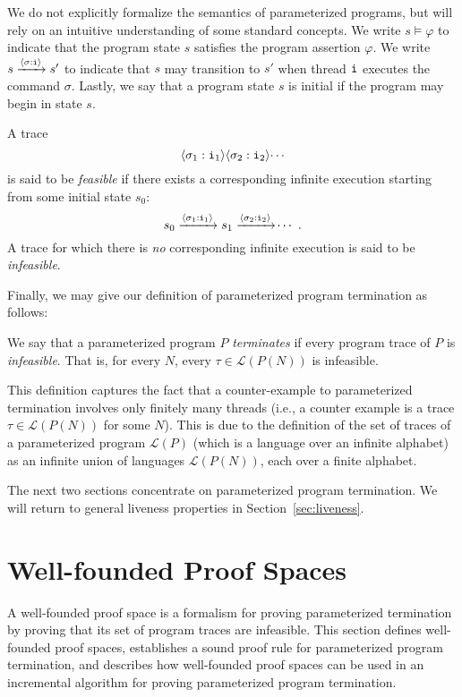 \documentclass[9pt,nocopyrightspace]{sigplanconf}
\theoremstyle{definition}
\newcommand{\tuple}[1]{\langle #1 \rangle}
\newcommand{\idx}[1]{\text{\rm\texttt{#1}}}
\newcommand{\ic}[2]{{\tuple{#1 : #2}}}
\newcommand{\lang}{\mathcal{L}}
\renewcommand{\phi}{\varphi}
\begin{document}
We do not explicitly formalize the semantics of parameterized programs, but
will rely on an intuitive understanding of some standard concepts.  We write
$s \models \phi$ to indicate that the program state $s$ satisfies the program
assertion $\phi$.  We write $s \xrightarrow{\ic{\sigma}{\idx{i}}} s'$ to
indicate that $s$ may transition to $s'$ when thread $\idx{i}$ executes the
command $\sigma$.  Lastly, we say that a program state $s$ is initial if the
program may begin in state $s$.

A trace
\[ \ic{\sigma_1}{\idx{i}_1}\ic{\sigma_2}{\idx{i}_2}\dotsi \]
is said to be \emph{feasible} if there exists a corresponding infinite
execution starting from some initial state $s_0$:
\[ s_0 \xrightarrow{\ic{\sigma_1}{\idx{i}_1}} s_1 \xrightarrow{\ic{\sigma_2}{\idx{i}_2}} \dotsi \ . \]
A trace for which there is \emph{no} corresponding infinite execution is said to be \emph{infeasible}.

Finally, we may give our definition of parameterized program termination as follows:
\begin{definition}\label{def:parameterizedtermination}
  We say that a parameterized program $P$ \emph{terminates} if every program trace
of $P$
is \emph{infeasible}.  
That is, for
  every $N$, every $\tau \in \lang(P(N))$ is infeasible.
\end{definition}

This definition captures the fact that a counter-example to parameterized termination involves only finitely many threads (i.e., a counter example is a trace $\tau \in \lang(P(N))$ for some $N$).  
This is due to the definition of the set of traces of a parameterized program $\lang(P)$  (which is a language over an infinite alphabet) as an infinite union of languages $\lang(P(N))$, each over a finite alphabet.

The next two sections concentrate on parameterized program termination.  We will return to general liveness properties in Section~\ref{sec:liveness}.








\section{Well-founded Proof Spaces} \label{sec:proofspace}

A well-founded proof space is a formalism for proving parameterized
termination by proving that its set of program traces are infeasible.  This
section defines well-founded proof spaces, establishes a sound proof rule for
parameterized program termination, and describes how well-founded proof spaces
can be used in an incremental algorithm for proving parameterized program
termination.
\end{document}

